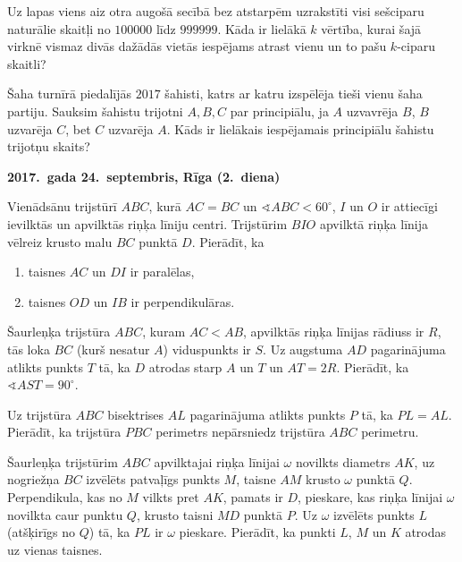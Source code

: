 \documentclass[11pt]{article}
\begin{document}
\begin{problem}[BW.TST.2017.7]
Uz lapas viens aiz otra augošā secībā bez atstarpēm uzrakstīti visi sešciparu 
naturālie skaitļi no $100000$ līdz $999999$. Kāda ir lielākā $k$ vērtība, kurai 
šajā virknē vismaz divās dažādās vietās iespējams atrast vienu un to pašu 
$k$-ciparu skaitli?
\end{problem}

\begin{problem}[BW.TST.2017.8]
Šaha turnīrā piedalījās $2017$ šahisti, katrs ar katru izspēlēja tieši vienu šaha
partiju. Sauksim šahistu trijotni $A,B,C$ par principiālu, ja $A$ uzvavrēja $B$, 
$B$ uzvarēja $C$, bet $C$ uzvarēja $A$. Kāds ir lielākais iespējamais principiālu 
šahistu trijotņu skaits? 
\end{problem}




\begin{center}
{\bf 2017.\ gada 24.\ septembris, Rīga (2.\ diena)}
\end{center}

\begin{problem}[BW.TST.2017.9]
Vienādsānu trijstūrī $ABC$, kurā $AC=BC$ un $\sphericalangle{}ABC < 60^{\circ}$, 
$I$ un $O$ ir attiecīgi ievilktās un apvilktās riņķa līniju centri. 
Trijstūrim $BIO$ apvilktā riņķa līnija vēlreiz krusto malu $BC$ punktā $D$. 
Pierādīt, ka 
\begin{enumerate}
\item taisnes $AC$ un $DI$ ir paralēlas, 
\item taisnes $OD$ un $IB$ ir perpendikulāras.
\end{enumerate}
\end{problem}


\begin{problem}[BW.TST.2017.10]
Šaurleņķa trijstūra $ABC$, kuram $AC < AB$, apvilktās riņķa līnijas rādiuss ir $R$, 
tās loka $BC$ (kurš nesatur $A$) viduspunkts ir $S$. Uz augstuma $AD$ pagarinājuma 
atlikts punkts $T$ tā, ka $D$ atrodas starp $A$ un $T$ un $AT = 2R$. 
Pierādīt, ka $\sphericalangle{} AST = 90^{\circ}$. 
\end{problem}

\begin{problem}[BW.TST.2017.11]
Uz trijstūra $ABC$ bisektrises $AL$ pagarinājuma atlikts punkts $P$ tā, ka 
$PL = AL$. Pierādīt, ka trijstūra $PBC$ perimetrs nepārsniedz trijstūra $ABC$ perimetru. 
\end{problem}

\begin{problem}[BW.TST.2017.12]
Šaurleņķa trijstūrim $ABC$ apvilktajai riņķa līnijai $\omega$ novilkts diametrs $AK$, 
uz nogriežņa $BC$ izvēlēts patvaļīgs punkts $M$, taisne $AM$ krusto $\omega$ punktā $Q$. 
Perpendikula, kas no $M$ vilkts pret $AK$, pamats ir $D$, pieskare, kas riņķa līnijai 
$\omega$ novilkta caur punktu $Q$, krusto taisni $MD$ punktā $P$. 
Uz $\omega$ izvēlēts punkts $L$ (atšķirīgs no $Q$) tā, ka $PL$ ir $\omega$ pieskare. 
Pierādīt, ka punkti $L$, $M$ un $K$ atrodas uz vienas taisnes. 
\end{problem}
\end{document}
